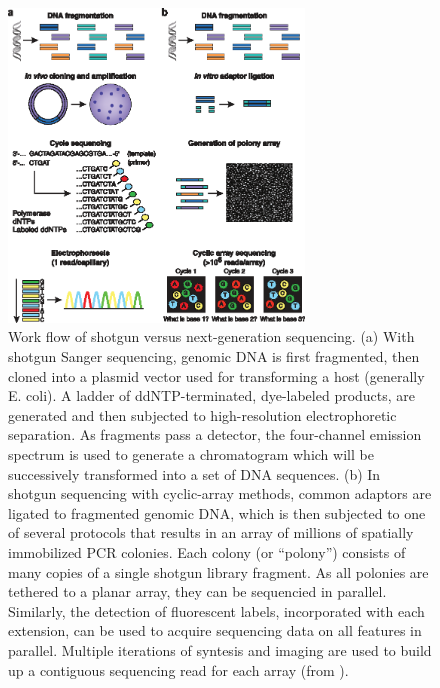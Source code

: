 \begin{figure}[!tb]
	\centering
	\includegraphics[width=0.7\textwidth]{./figures/Introduction/seq_approaches}
  	\caption{Work flow of shotgun versus next-generation sequencing. (a) With shotgun Sanger sequencing, genomic DNA is first fragmented, then cloned into a plasmid vector used for transforming a host (generally E. coli). A ladder of ddNTP-terminated, dye-labeled products, are generated and then subjected to high-resolution electrophoretic separation. As fragments pass a detector, the four-channel emission spectrum is used to generate a chromatogram which will be successively transformed into a set of DNA sequences. (b) In shotgun sequencing with cyclic-array methods, common adaptors are ligated to fragmented genomic DNA, which is then subjected to one of several protocols that results in an array of millions of spatially immobilized PCR colonies. Each colony (or ``polony'') consists of many copies of a single shotgun library fragment. As all polonies are tethered to a planar array, they can be sequencied in parallel. Similarly, the detection of fluorescent labels, incorporated with each extension, can be used to acquire sequencing data on all features in parallel. Multiple iterations of syntesis and imaging are used to build up a contiguous sequencing read for each array (from \cite{shendure2008next}). \label{fig:seqappr}}
\end{figure}
